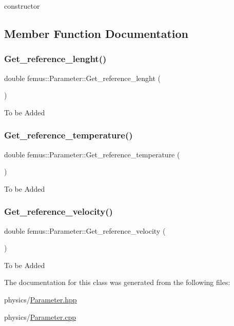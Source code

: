 constructor 

\subsection{Member Function Documentation}
\mbox{\label{classfemus_1_1_parameter_a1d27ac6c41d5037a5cebb5f5a9e1b203}} 
\subsubsection{\texorpdfstring{Get\+\_\+reference\+\_\+lenght()}{Get\_reference\_lenght()}}
{\footnotesize\ttfamily double femus\+::\+Parameter\+::\+Get\+\_\+reference\+\_\+lenght (\begin{DoxyParamCaption}{ }\end{DoxyParamCaption})}

To be Added \mbox{\label{classfemus_1_1_parameter_a39561836eaa009fdce3ff8c4b27b8a8b}} 
\subsubsection{\texorpdfstring{Get\+\_\+reference\+\_\+temperature()}{Get\_reference\_temperature()}}
{\footnotesize\ttfamily double femus\+::\+Parameter\+::\+Get\+\_\+reference\+\_\+temperature (\begin{DoxyParamCaption}{ }\end{DoxyParamCaption})}

To be Added \mbox{\label{classfemus_1_1_parameter_aaad3fbaf22261a9b29e00ff2c06c2d0d}} 
\subsubsection{\texorpdfstring{Get\+\_\+reference\+\_\+velocity()}{Get\_reference\_velocity()}}
{\footnotesize\ttfamily double femus\+::\+Parameter\+::\+Get\+\_\+reference\+\_\+velocity (\begin{DoxyParamCaption}{ }\end{DoxyParamCaption})}

To be Added 

The documentation for this class was generated from the following files\+:\begin{DoxyCompactItemize}
\item 
physics/\mbox{\hyperlink{_parameter_8hpp}{Parameter.\+hpp}}\item 
physics/\mbox{\hyperlink{_parameter_8cpp}{Parameter.\+cpp}}\end{DoxyCompactItemize}
